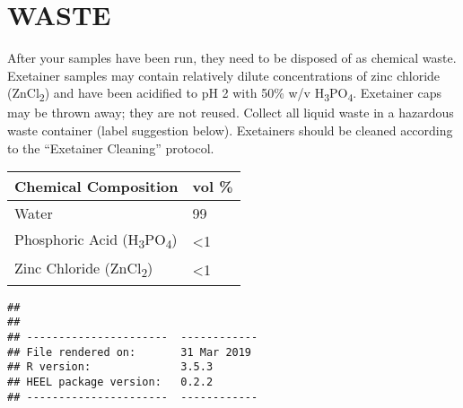 \documentclass[]{article}
\begin{document}
\section{WASTE}\label{waste}

After your samples have been run, they need to be disposed of as
chemical waste. Exetainer samples may contain relatively dilute
concentrations of zinc chloride (ZnCl\textsubscript{2}) and have been
acidified to pH 2 with 50\% w/v H\textsubscript{3}PO\textsubscript{4}.
Exetainer caps may be thrown away; they are not reused. Collect all
liquid waste in a hazardous waste container (label suggestion below).
Exetainers should be cleaned according to the ``Exetainer Cleaning''
protocol.

\begin{longtable}[]{@{}ll@{}}
\toprule
Chemical Composition & vol \%\tabularnewline
\midrule
\endhead
Water & 99\tabularnewline
Phosphoric Acid (H\textsubscript{3}PO\textsubscript{4}) &
\textless{}1\tabularnewline
Zinc Chloride (ZnCl\textsubscript{2}) & \textless{}1\tabularnewline
\bottomrule
\end{longtable}

\begin{verbatim}
## 
## 
## ----------------------  ------------
## File rendered on:       31 Mar 2019 
## R version:              3.5.3       
## HEEL package version:   0.2.2       
## ----------------------  ------------
\end{verbatim}
\end{document}
